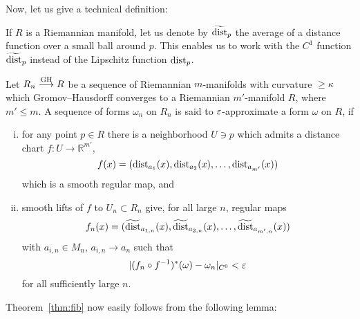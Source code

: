 \documentclass{amsart}
\begin{document}
Now, let us give a technical definition:


If $R$ is a Riemannian manifold,
let us denote by $\widetilde{\operatorname{\rm dist}}_p$ the average of a distance function
over a small ball around $p$.
This enables us
to work with the $C^{1}$  function $\widetilde{\operatorname{\rm dist}}_p$
instead of the Lipschitz function $\operatorname{\rm dist}_p$.

\begin{defn}\label{def:close}
Let $R_n\GHto R$ be a sequence of Riemannian $m$-manifolds
with curvature $\ge \kappa$ which Gromov--Hausdorff converges
to a Riemannian $m'$-manifold $R$, where $m'\le m$.
A sequence of forms $\omega_n$ on $R_n$ is said to
$\varepsilon$-approximate a form $\omega$ on $R$,
if
\begin{enumerate}[(i)]
\item
for any point $p\in R$ there is a neighborhood $U\ni p$
which admits a distance chart $f\colon U\to \mathbb{R}^{m'}$,
$$f(x)=(\operatorname{\rm dist}_{a_1}(x),\operatorname{\rm dist}_{a_2}(x),\dots,\operatorname{\rm dist}_{a_{m'}}(x))$$
which is a smooth regular map,
and

\item
smooth lifts of $f$ to $U_n\subset R_n$
give, for all large $n$, regular maps
$$f_n(x)=(\widetilde{\operatorname{\rm dist}}_{a_{1,n}}(x),\widetilde{\operatorname{\rm dist}}_{a_{2,n}}(x),\dots,
\widetilde{\operatorname{\rm dist}}_{a_{m',n}}(x))$$
with $a_{i,n}\in M_n$, $a_{i,n}\to a_{n}$
such that
$$|(f_n\circ f^{-1})^*(\omega)-\omega_n|_{C^{0}}<\varepsilon$$
for all sufficiently large $n$.

\end{enumerate}

\end{defn}

Theorem~\ref{thm:fib} now easily follows from the following lemma:
\end{document}
